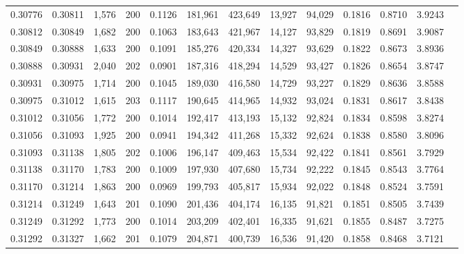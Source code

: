 \begin{tabular}{rrrrrrrrrrrrr}
0.30776 & 0.30811 & 1,576 & 200 &                                     0.1126 & 181,961 & 423,649 &  13,927 &  94,029 & 0.1816 & 0.8710 & 3.9243 \\
0.30812 & 0.30849 & 1,682 & 200 &                                     0.1063 & 183,643 & 421,967 &  14,127 &  93,829 & 0.1819 & 0.8691 & 3.9087 \\
0.30849 & 0.30888 & 1,633 & 200 &                                     0.1091 & 185,276 & 420,334 &  14,327 &  93,629 & 0.1822 & 0.8673 & 3.8936 \\
0.30888 & 0.30931 & 2,040 & 202 &                                     0.0901 & 187,316 & 418,294 &  14,529 &  93,427 & 0.1826 & 0.8654 & 3.8747 \\
0.30931 & 0.30975 & 1,714 & 200 &                                     0.1045 & 189,030 & 416,580 &  14,729 &  93,227 & 0.1829 & 0.8636 & 3.8588 \\
0.30975 & 0.31012 & 1,615 & 203 &                                     0.1117 & 190,645 & 414,965 &  14,932 &  93,024 & 0.1831 & 0.8617 & 3.8438 \\
0.31012 & 0.31056 & 1,772 & 200 &                                     0.1014 & 192,417 & 413,193 &  15,132 &  92,824 & 0.1834 & 0.8598 & 3.8274 \\
0.31056 & 0.31093 & 1,925 & 200 &                                     0.0941 & 194,342 & 411,268 &  15,332 &  92,624 & 0.1838 & 0.8580 & 3.8096 \\
0.31093 & 0.31138 & 1,805 & 202 &                                     0.1006 & 196,147 & 409,463 &  15,534 &  92,422 & 0.1841 & 0.8561 & 3.7929 \\
0.31138 & 0.31170 & 1,783 & 200 &                                     0.1009 & 197,930 & 407,680 &  15,734 &  92,222 & 0.1845 & 0.8543 & 3.7764 \\
0.31170 & 0.31214 & 1,863 & 200 &                                     0.0969 & 199,793 & 405,817 &  15,934 &  92,022 & 0.1848 & 0.8524 & 3.7591 \\
0.31214 & 0.31249 & 1,643 & 201 &                                     0.1090 & 201,436 & 404,174 &  16,135 &  91,821 & 0.1851 & 0.8505 & 3.7439 \\
0.31249 & 0.31292 & 1,773 & 200 &                                     0.1014 & 203,209 & 402,401 &  16,335 &  91,621 & 0.1855 & 0.8487 & 3.7275 \\
0.31292 & 0.31327 & 1,662 & 201 &                                     0.1079 & 204,871 & 400,739 &  16,536 &  91,420 & 0.1858 & 0.8468 & 3.7121 \\

\end{tabular}
